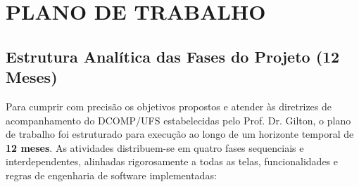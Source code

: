 \chapter{PLANO DE TRABALHO}
\label{cap:plano-trabalho}

\section{Estrutura Analítica das Fases do Projeto (12 Meses)}
\label{sec:fases-projeto}

Para cumprir com precisão os objetivos propostos e atender às diretrizes de acompanhamento do DCOMP/UFS estabelecidas pelo Prof. Dr. Gilton, o plano de trabalho foi estruturado para execução ao longo de um horizonte temporal de \textbf{12 meses}. As atividades distribuem-se em quatro fases sequenciais e interdependentes, alinhadas rigorosamente a todas as telas, funcionalidades e regras de engenharia de software implementadas:

